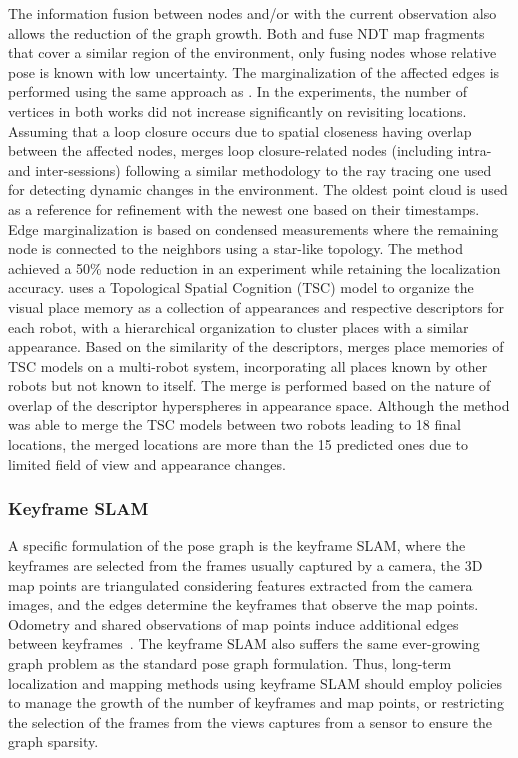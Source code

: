 The information fusion between nodes and/or with the current observation also allows the reduction of the graph growth.
Both \cite{einhorn-gross:2013:6698849} and \cite{einhorn-gross:2015:008} fuse NDT map fragments that cover a similar region of the environment, only fusing nodes whose relative pose is known with low uncertainty. The marginalization of the affected edges is performed using the same approach as \cite{kretzschmar-et-al:2010:2}. In the experiments, the number of vertices in both works did not increase significantly on revisiting locations.
Assuming that a loop closure occurs due to spatial closeness having overlap between the affected nodes, \cite{lázaro-et-al:2018:8594310} merges loop closure-related nodes (including intra- and inter-sessions) following a similar methodology to the ray tracing one used for detecting dynamic changes in the environment. The oldest point cloud is used as a reference for refinement with the newest one based on their timestamps. Edge marginalization is based on condensed measurements where the remaining node is connected to the neighbors using a star-like topology. The method achieved a 50\% node reduction in an experiment while retaining the localization accuracy.
\cite{karaoguz-bozma:2020:2} uses a Topological Spatial Cognition (TSC) model to organize the visual place memory as a collection of appearances and respective descriptors for each robot, with a hierarchical organization to cluster places with a similar appearance. Based on the similarity of the descriptors, \cite{karaoguz-bozma:2020:2} merges place memories of TSC models on a multi-robot system, incorporating all places known by other robots but not known to itself. The merge is performed based on the nature of overlap of the descriptor hyperspheres in appearance space. Although the method was able to merge the TSC models between two robots leading to 18 final locations, the merged locations are more than the 15 predicted ones due to limited field of view and appearance changes.



\subsubsection{Keyframe SLAM}

A specific formulation of the pose graph is the keyframe SLAM, where the keyframes are selected from the frames usually captured by a camera, the 3D map points are triangulated considering features extracted from the camera images, and the edges determine the keyframes that observe the map points. Odometry and shared observations of map points induce additional edges between keyframes~\parencite{schmuck-chli:2019:00071}.
The keyframe SLAM also suffers the same ever-growing graph problem as the standard pose graph formulation. Thus, long-term localization and mapping methods using keyframe SLAM should employ policies to manage the growth of the number of keyframes and map points, or restricting the selection of the frames from the views captures from a sensor to ensure the graph sparsity.


